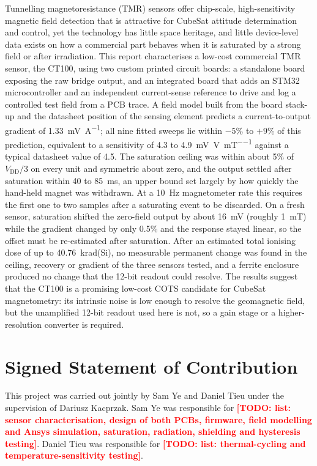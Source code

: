 \documentclass[12pt,a4paper]{article}
\newcommand{\todo}[1]{\textcolor{red}{\textbf{[TODO: #1]}}}
\begin{document}
Tunnelling magnetoresistance (TMR) sensors offer chip-scale, high-sensitivity magnetic field detection that is attractive for CubeSat attitude determination and control, yet the technology has little space heritage, and little device-level data exists on how a commercial part behaves when it is saturated by a strong field or after irradiation. This report characterises a low-cost commercial TMR sensor, the CT100, using two custom printed circuit boards: a standalone board exposing the raw bridge output, and an integrated board that adds an STM32 microcontroller and an independent current-sense reference to drive and log a controlled test field from a PCB trace. A field model built from the board stack-up and the datasheet position of the sensing element predicts a current-to-output gradient of \SI{1.33}{\milli\volt\per\ampere}; all nine fitted sweeps lie within $-5\%$ to $+9\%$ of this prediction, equivalent to a sensitivity of 4.3 to \SI{4.9}{\milli\volt\per\volt\per\milli\tesla} against a typical datasheet value of 4.5. The saturation ceiling was within about 5\% of $V_{\text{DD}}/3$ on every unit and symmetric about zero, and the output settled after saturation within 40 to \SI{85}{\milli\second}, an upper bound set largely by how quickly the hand-held magnet was withdrawn. At a \SI{10}{\hertz} magnetometer rate this requires the first one to two samples after a saturating event to be discarded. On a fresh sensor, saturation shifted the zero-field output by about \SI{16}{\milli\volt} (roughly \SI{1}{\milli\tesla}) while the gradient changed by only 0.5\% and the response stayed linear, so the offset must be re-estimated after saturation. After an estimated total ionising dose of up to \SI{40.76}{\kilo rad}(Si), no measurable permanent change was found in the ceiling, recovery or gradient of the three sensors tested, and a ferrite enclosure produced no change that the 12-bit readout could resolve. The results suggest that the CT100 is a promising low-cost COTS candidate for CubeSat magnetometry: its intrinsic noise is low enough to resolve the geomagnetic field, but the unamplified 12-bit readout used here is not, so a gain stage or a higher-resolution converter is required.

\clearpage

\section*{Signed Statement of Contribution}
This project was carried out jointly by Sam Ye and Daniel Tieu under the supervision of Dariusz Kacprzak. Sam Ye was responsible for \todo{list: sensor characterisation, design of both PCBs, firmware, field modelling and Ansys simulation, saturation, radiation, shielding and hysteresis testing}. Daniel Tieu was responsible for \todo{list: thermal-cycling and temperature-sensitivity testing}.
 
\end{document}
